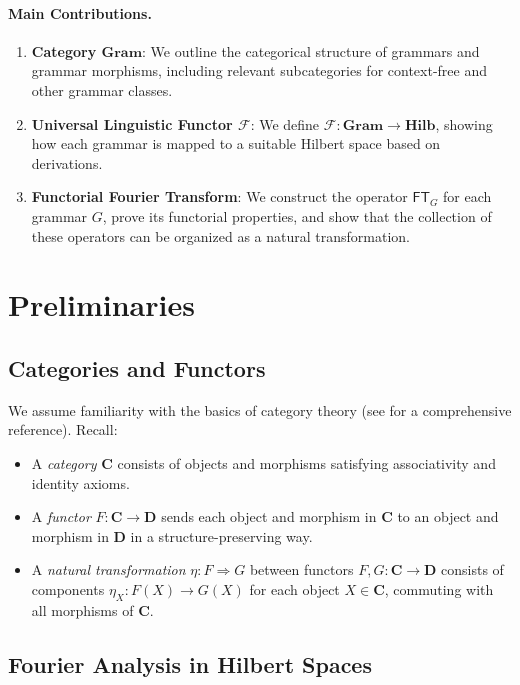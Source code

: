 \documentclass[11pt]{article}
\begin{document}
\paragraph{Main Contributions.}
\begin{enumerate}
    \item \textbf{Category \(\mathbf{Gram}\)}: We outline the categorical structure of grammars and grammar morphisms, including relevant subcategories for context-free and other grammar classes.
    \item \textbf{Universal Linguistic Functor \(\mathcal{F}\)}: We define \(\mathcal{F} : \mathbf{Gram} \to \mathbf{Hilb}\), showing how each grammar is mapped to a suitable Hilbert space based on derivations.
    \item \textbf{Functorial Fourier Transform}: We construct the operator \(\mathsf{FT}_G\) for each grammar \(G\), prove its functorial properties, and show that the collection of these operators can be organized as a natural transformation.
\end{enumerate}

\section{Preliminaries}

\subsection{Categories and Functors}

We assume familiarity with the basics of category theory (see \cite{maclane} for a comprehensive reference). Recall:
\begin{itemize}
    \item A \emph{category} \(\mathbf{C}\) consists of objects and morphisms satisfying associativity and identity axioms.
    \item A \emph{functor} \(F : \mathbf{C} \to \mathbf{D}\) sends each object and morphism in \(\mathbf{C}\) to an object and morphism in \(\mathbf{D}\) in a structure-preserving way.
    \item A \emph{natural transformation} \(\eta : F \Rightarrow G\) between functors \(F, G : \mathbf{C} \to \mathbf{D}\) consists of components \(\eta_X : F(X) \to G(X)\) for each object \(X\in \mathbf{C}\), commuting with all morphisms of \(\mathbf{C}\).
\end{itemize}

\subsection{Fourier Analysis in Hilbert Spaces}
\end{document}
